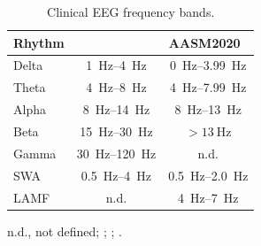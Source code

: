             \begin{table}
            \small
            \centering
            \begin{threeparttable}
                \caption[Clinical \acs{EEG} frequency bands]{Clinical \acs{EEG} frequency bands.}
                \label{tab:eeg_rythms}
                \begin{tabular}{@{}lcc@{}} \toprule
                    \textbf{Rhythm} & \textbf{\citet{Brown2012}} & \textbf{\acs{AASM}2020~\cite{Berry2020}} \\ \midrule
                    Delta & \SIrange{1}{4}{\hertz} & \SIrange{0}{3.99}{\hertz} \\
                    Theta & \SIrange{4}{8}{\hertz} & \SIrange{4}{7.99}{\hertz} \\
                    Alpha & \SIrange{8}{14}{\hertz} & \SIrange{8}{13}{\hertz} \\
                    Beta & \SIrange{15}{30}{\hertz} & $>\SI{13}{\hertz}$\\
                    Gamma & \SIrange{30}{120}{\hertz} & n.d.\\ \midrule
                    \acs{SWA} & \SIrange{0.5}{4}{\hertz} & \SIrange{0.5}{2.0}{\hertz} \\
                    \acs{LAMF} & n.d. & \SIrange{4}{7}{\hertz} \\\bottomrule
                \end{tabular}
                \begin{tablenotes}
                    \item n.d., not defined; %
                    ; %
                    ; %
                    .
                \end{tablenotes}
            \end{threeparttable}
            \end{table}
            

